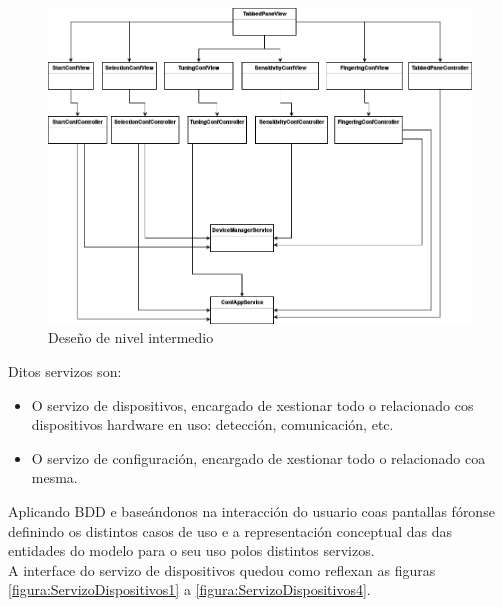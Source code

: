    \begin{figure}[htbp]
    \centering
    \includegraphics[scale=0.6, angle=90, keepaspectratio=true]{./imagenes/deseno-ni.png}
    \caption{Deseño de nivel intermedio}
    \label{figura:DesenoNivelIntermedio}
   \end{figure}
   
   Ditos servizos son:
   
   \begin{itemize}
    \item O servizo de dispositivos, encargado de xestionar todo o relacionado
        cos dispositivos hardware en uso: detección, comunicación, etc.
    \item O servizo de configuración, encargado de xestionar todo o relacionado
        coa mesma.
   \end{itemize}
   
   Aplicando BDD e baseándonos na interacción do usuario coas pantallas fóronse
   definindo os distintos casos de uso e a representación conceptual das
   das entidades do modelo para o seu uso polos distintos servizos. \\
   
   A interface do servizo de dispositivos quedou como reflexan as figuras
   \ref{figura:ServizoDispositivos1} a \ref{figura:ServizoDispositivos4}. \\
   
